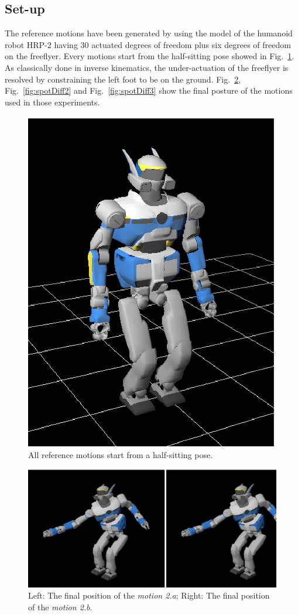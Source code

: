 \documentclass[journal]{IEEEtran}
\begin{document}
\subsection{Set-up}
The reference motions have been generated by using the model of the humanoid robot HRP-2 
having 30 actuated degrees of freedom plus six degrees of freedom on the
freeflyer. Every motions start from the half-sitting pose showed in Fig.~\ref{fig:halfSit}.
As classically done in inverse kinematics, the under-actuation of the freeflyer is resolved by constraining
the left foot to be on the ground. 
Fig.~\ref{fig:spotDiff1},
Fig.~\ref{fig:spotDiff2} and Fig.~\ref{fig:spotDiff3} show the final posture of the motions used in those
experiments.
\begin{figure}[t]
\begin{center}
\includegraphics[width=0.3\linewidth]{img/halfSit.ps}
\end{center}
\caption{All reference motions start from a half-sitting pose.}
\label{fig:halfSit}
\end{figure}
\begin{figure}[t]
  \begin{center}
    \includegraphics[width=0.9\linewidth]{img/spotDiff.ps}
  \end{center}
  \caption{Left: The final position of the \emph{motion 2.a}; Right: The final position of the \emph{motion 2.b}.}
  \label{fig:spotDiff1}
\end{figure}
\end{document}
